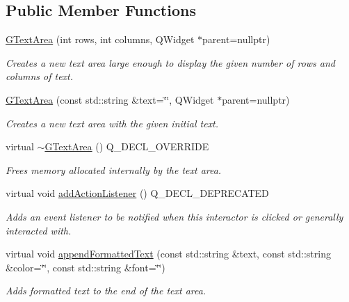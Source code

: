 \subsection*{Public Member Functions}
\begin{DoxyCompactItemize}
\item 
\mbox{\hyperlink{classGTextArea_aad263200ff85ead4d5e4d013c95c3107}{G\+Text\+Area}} (int rows, int columns, Q\+Widget $\ast$parent=nullptr)
\begin{DoxyCompactList}\small\item\em Creates a new text area large enough to display the given number of rows and columns of text. \end{DoxyCompactList}\item 
\mbox{\hyperlink{classGTextArea_a0902cdcc62cad5c1c81fc74ce38d8b13}{G\+Text\+Area}} (const std\+::string \&text=\char`\"{}\char`\"{}, Q\+Widget $\ast$parent=nullptr)
\begin{DoxyCompactList}\small\item\em Creates a new text area with the given initial text. \end{DoxyCompactList}\item 
virtual \mbox{\hyperlink{classGTextArea_a260e7e5c7191b6200b0a2d2cfc0caf17}{$\sim$\+G\+Text\+Area}} () Q\+\_\+\+D\+E\+C\+L\+\_\+\+O\+V\+E\+R\+R\+I\+DE
\begin{DoxyCompactList}\small\item\em Frees memory allocated internally by the text area. \end{DoxyCompactList}\item 
virtual void \mbox{\hyperlink{classGInteractor_a02f20ea6edfa0671f31c4c648a253833}{add\+Action\+Listener}} () Q\+\_\+\+D\+E\+C\+L\+\_\+\+D\+E\+P\+R\+E\+C\+A\+T\+ED
\begin{DoxyCompactList}\small\item\em Adds an event listener to be notified when this interactor is clicked or generally interacted with. \end{DoxyCompactList}\item 
virtual void \mbox{\hyperlink{classGTextArea_ac7d00bfb7f87912fd664b97f29cc71e9}{append\+Formatted\+Text}} (const std\+::string \&text, const std\+::string \&color=\char`\"{}\char`\"{}, const std\+::string \&font=\char`\"{}\char`\"{})
\begin{DoxyCompactList}\small\item\em Adds formatted text to the end of the text area. \end{DoxyCompactList}\item 

\end{DoxyCompactItemize}
